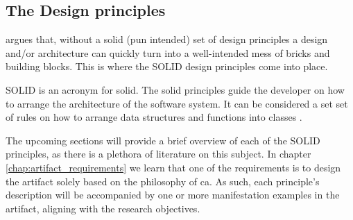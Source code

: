 \subsection{The Design principles} \label{subsec:design_principles}

 argues that, without a solid (pun intended) set of
design principles a design and/or architecture can quickly turn into a well-intended mess
of bricks and building blocks. This is where the SOLID design principles come into place.

SOLID is an acronym for \gls{solid}. The \gls{solid} principles guide the developer on how
to arrange the architecture of the software system. It can be considered a set set of
rules on how to arrange data structures and functions into classes
\parencite[78]{robert_c_martin_clean_2018}.

The upcoming sections will provide a brief overview of each of the SOLID principles, as
there is a plethora of literature on this subject. In chapter
\ref{chap:artifact_requirements} we learn that one of the requirements is to design the
artifact solely based on the philosophy of \gls{ca}. As such, each principle's description
will be accompanied by one or more manifestation examples in the artifact, aligning with
the research objectives.